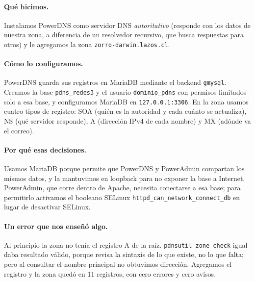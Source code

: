\documentclass[11pt,a4paper]{article}
\begin{document}
\paragraph{Qué hicimos.} Instalamos PowerDNS como servidor DNS \emph{autoritativo} (responde con los datos de nuestra zona, a diferencia de un resolvedor recursivo, que busca respuestas para otros) y le agregamos la zona \texttt{zorro-darwin.lazos.cl}.

\paragraph{Cómo lo configuramos.} PowerDNS guarda sus registros en MariaDB mediante el backend \texttt{gmysql}. Creamos la base \texttt{pdns\_redes3} y el usuario \texttt{dominio\_pdns} con permisos limitados solo a esa base, y configuramos MariaDB en \texttt{127.0.0.1:3306}. En la zona usamos cuatro tipos de registro: SOA (quién es la autoridad y cada cuánto se actualiza), NS (qué servidor responde), A (dirección IPv4 de cada nombre) y MX (adónde va el correo).

\paragraph{Por qué esas decisiones.} Usamos MariaDB porque permite que PowerDNS y PowerAdmin compartan los mismos datos, y la mantuvimos en loopback para no exponer la base a Internet. PowerAdmin, que corre dentro de Apache, necesita conectarse a esa base; para permitirlo activamos el booleano SELinux \texttt{httpd\_can\_network\_connect\_db} en lugar de desactivar SELinux.

\paragraph{Un error que nos enseñó algo.} Al principio la zona no tenía el registro A de la raíz. \texttt{pdnsutil zone check} igual daba resultado válido, porque revisa la sintaxis de lo que existe, no lo que falta; pero al consultar el nombre principal no obtuvimos dirección. Agregamos el registro y la zona quedó en 11 registros, con cero errores y cero avisos.
\end{document}
